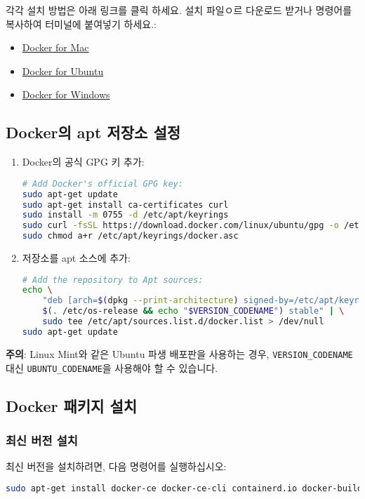 각각 설치 방법은 아래 링크를 클릭 하세요. 설치 파일ㅇ르 다운로드 받거나 명령어를 복사하여 터미널에 붙여넣기 하세요.:
\begin{itemize}
    \item \href{https://docs.docker.com/docker-for-mac/}{Docker for Mac}
    \item \href{https://docs.docker.com/engine/install/ubuntu/}{Docker for Ubuntu}
    \item \href{https://docs.docker.com/desktop/install/windows-install/}{Docker for Windows}
\end{itemize}

\subsection{Docker의 apt 저장소 설정}

\begin{enumerate}
\item Docker의 공식 GPG 키 추가:
\begin{lstlisting}[language=bash]
# Add Docker's official GPG key:
sudo apt-get update
sudo apt-get install ca-certificates curl
sudo install -m 0755 -d /etc/apt/keyrings
sudo curl -fsSL https://download.docker.com/linux/ubuntu/gpg -o /etc/apt/keyrings/docker.asc
sudo chmod a+r /etc/apt/keyrings/docker.asc
\end{lstlisting}

\item 저장소를 apt 소스에 추가:
\begin{lstlisting}[language=bash]
# Add the repository to Apt sources:
echo \
    "deb [arch=$(dpkg --print-architecture) signed-by=/etc/apt/keyrings/docker.asc] https://download.docker.com/linux/ubuntu \
    $(. /etc/os-release && echo "$VERSION_CODENAME") stable" | \
    sudo tee /etc/apt/sources.list.d/docker.list > /dev/null
sudo apt-get update
\end{lstlisting}
\end{enumerate}

\textbf{주의}: Linux Mint와 같은 Ubuntu 파생 배포판을 사용하는 경우, \texttt{VERSION\_CODENAME} 대신 \texttt{UBUNTU\_CODENAME}을 사용해야 할 수 있습니다.

\subsection{Docker 패키지 설치}

\subsubsection{최신 버전 설치}
최신 버전을 설치하려면, 다음 명령어를 실행하십시오:
\begin{lstlisting}[language=bash]
 sudo apt-get install docker-ce docker-ce-cli containerd.io docker-buildx-plugin docker-compose-plugin
\end{lstlisting}

